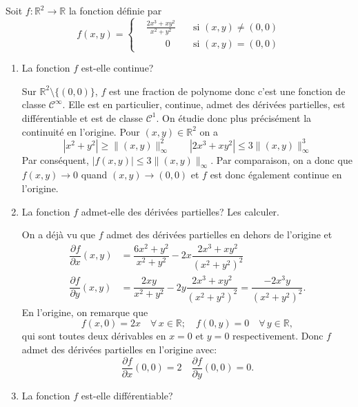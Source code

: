 \documentclass[a4paper]{tp_um}
\begin{document}
\exo{}
Soit $f : \mathbb R^2 \to \mathbb R$ la fonction d\'efinie par
\[
f(x,y) =
\left\{
\begin{aligned}
&\frac{2x^3 + x y^2}{x^2 + y^2} \quad &\text{si } (x,y) \neq (0,0) \\
& \qquad 0 \quad &\text{si } (x,y) = (0,0)
\end{aligned}
\right.
\]
\begin{enumerate}
\item La fonction $f$ est-elle continue?

\medskip

Sur $\mathbb R^2 \setminus \{(0,0)\}$, $f$ est une fraction de polynome donc c'est une fonction de classe $\mathcal C^{\infty}.$ Elle est en particulier, continue, admet des d\'eriv\'ees partielles, est diff\'erentiable
et est de classe $\mathcal C^1$. On \'etudie donc plus pr\'ecis\'ement la continuit\'e en l'origine. Pour $(x,y) \in \mathbb R^2$ on a 
\[
|x^2 + y^2| \geq \|(x,y)\|^2_{\infty} \qquad |2x^3+xy^2|  \leq 3 \|(x,y)\|^3_{\infty}
\]   
Par cons\'equent, $|f(x,y)| \leq 3 \|(x,y)\|_{\infty}.$ Par comparaison, on a donc que $f(x,y) \to 0$ quand
$(x,y) \to (0,0)$ et $f$ est donc \'egalement continue en l'origine. 


\medskip

\item La fonction $f$ admet-elle des d\'eriv\'ees partielles? Les calculer.

\medskip

On a d\'ej\`a vu que $f$ admet des d\'eriv\'ees partielles en dehors de l'origine et 
\begin{align*}
\dfrac{\partial f}{\partial x}(x,y) & = \dfrac{6x^2 + y^2}{x^2 +y^2}  - 2 x \dfrac{2x^3 + x y^2}{(x^2+y^2)^2} \\
\dfrac{\partial f}{\partial y}(x,y) & = \dfrac{ 2xy}{x^2 +y^2}  - 2y \dfrac{2x^3 + x y^2}{(x^2+y^2)^2} = \dfrac{ -2x^3y}{(x^2 +y^2)^2} .
\end{align*}
En l'origine, on remarque que 
\[
f(x,0) = 2x \quad \forall \, x \in \mathbb R ; \quad f(0,y) = 0 \quad \forall \, y \in \mathbb R,
\]
qui sont toutes deux d\'erivables en $x=0$ et $y=0$ respectivement. Donc $f$ admet des d\'eriv\'ees partielles en l'origine
avec: 
\[
\dfrac{\partial f}{\partial x}(0,0) = 2 \quad \dfrac{\partial f}{\partial y}(0,0) = 0.    
\]

\medskip

\item La fonction $f$ est-elle diff\'erentiable?

\medskip


\end{enumerate}
\end{document}
